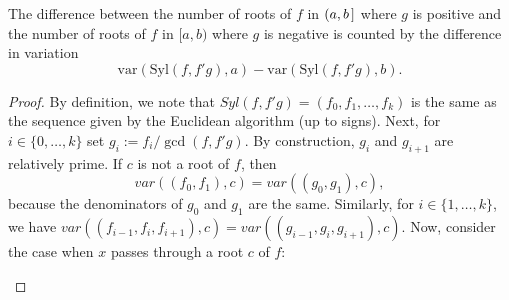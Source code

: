 \documentclass[12pt]{amsart}
\theoremstyle{definition}
\begin{document}
\theorem[Sylvester]
The difference between the number of roots of $f$ in $(a,b\hspace{.05cm}]$ where $g$ is positive and the number of roots of $f$ in $[a,b)$ where $g$ is negative is counted by the difference in variation $$\text{var}(\text{Syl}(f,f'g),a) - \text{var}(\text{Syl}(f,f'g),b).$$

\begin{proof} By definition, we note that $Syl(f,f'g) = (f_{0},f_{1},\dots, f_{k})$ is the same as the sequence given by the Euclidean algorithm (up to signs). Next, for $i\in\{0,\dots,k\}$ set $g_{i} := f_{i}/\gcd(f,f'g)$. By construction, $g_{i}$ and $g_{i+1}$ are relatively prime. If $c$ is not a root of $f$, then $$var\left((f_{0},f_{1}),c\right) = var\left((g_{0},g_{1}),c\right),$$ because the denominators of $g_{0}$ and $g_{1}$ are the same. Similarly, for $i\in\{1,\dots,k\}$, we have $var\left((f_{i-1},f_{i},f_{i+1}),c\right) = var\left((g_{i-1},g_{i},g_{i+1}),c\right)$. Now, consider the case when $x$ passes through a root $c$ of $f$:

\begin{table}[h]
\begin{subtable}{.3\linewidth}
\end{subtable}%
\begin{subtable}{.3\linewidth}
\end{subtable}
\end{table}


\end{proof}
\end{document}
